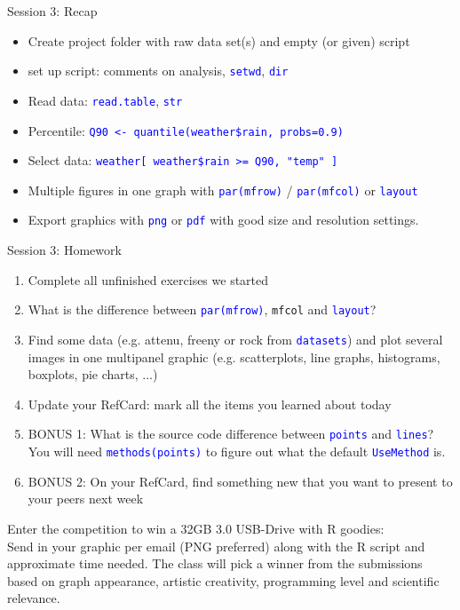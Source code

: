 \documentclass[xcolor=table,           xcolor=dvipsnames]{beamer}\usepackage[]{graphicx}\usepackage[]{color}
\newcommand{\rcode}[1]{\texttt{\textcolor{Blue}{#1}}} %
\begin{document}
\begin{frame}[fragile]{Session 3: Recap}
\begin{itemize}[<+->]
\item Create project folder with raw data set(s) and empty (or given) script
\item set up script: comments on analysis, \rcode{setwd}, \rcode{dir}
\item Read data: \rcode{read.table}, \rcode{str}
\item Percentile: \rcode{Q90 <- quantile(weather\$rain, probs=0.9)}
\item Select data: \rcode{weather[ weather\$rain >= Q90, "temp" ]}
\item Multiple figures in one graph with \rcode{par(mfrow)} / \rcode{par(mfcol)} or \rcode{layout}
\item Export graphics with \rcode{png} or \rcode{pdf} with good size and resolution settings.
\end{itemize}
\end{frame}


\begin{frame}{Session 3: Homework}
\begin{enumerate}[<+->]
  \item Complete all unfinished exercises we started
  \item What is the difference between \rcode{par(mfrow)}, \texttt{mfcol} and \rcode{layout}?
  \item Find some data (e.g. attenu, freeny or rock from \rcode{datasets}) and plot several images in one multipanel graphic (e.g. scatterplots, line graphs, histograms, boxplots, pie charts, ...)
  \item Update your RefCard: mark all the items you learned about today
  \item BONUS 1: What is the source code difference between \rcode{points} and \rcode{lines}? You will need \rcode{methods(points)} to figure out what the default \rcode{UseMethod} is.
  \item BONUS 2: On your RefCard, find something new that you want to present to your peers next week
\end{enumerate}
\pause
Enter the competition to win a 32GB 3.0 USB-Drive with R goodies:\\
Send in your graphic per email (PNG preferred) along with the R script and approximate time needed.
The class will pick a winner from the submissions based on graph appearance, artistic creativity, programming level and scientific relevance.
\end{frame}
\end{document}
